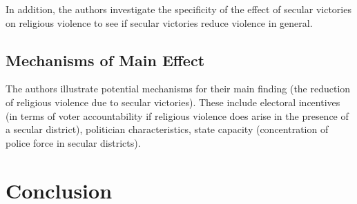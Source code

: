 \documentclass{scrartcl}
\begin{document}
In addition, the authors investigate the specificity of the effect of secular victories on religious violence to see if secular victories reduce violence in general. 

\subsection{Mechanisms of Main Effect}

The authors illustrate potential mechanisms for their main finding (the reduction of religious violence due to secular victories). These include electoral incentives (in terms of voter accountability if religious violence does arise in the presence of a secular district), politician characteristics, state capacity (concentration of police force in secular districts).

\section{Conclusion}
\end{document}
